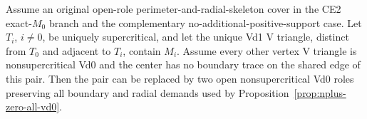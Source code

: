 \begin{lemma}
\label{lem:vd1-pair-replacement}
\leavevmode\par\noindent
Assume an original open-role perimeter-and-radial-skeleton cover in the CE2
exact-$M_0$ branch and the complementary no-additional-positive-support
case.  Let $T_i$, $i\ne0$, be uniquely supercritical, and let the unique Vd1
V triangle, distinct from $T_0$ and adjacent to $T_i$, contain $M_i$.  Assume every
other vertex V triangle is nonsupercritical Vd0 and the center has no boundary trace
on the shared edge of this pair.  Then the pair can be replaced by two open
nonsupercritical Vd0 roles preserving all boundary and radial demands used
by Proposition~\ref{prop:nplus-zero-all-vd0}.
\end{lemma}


